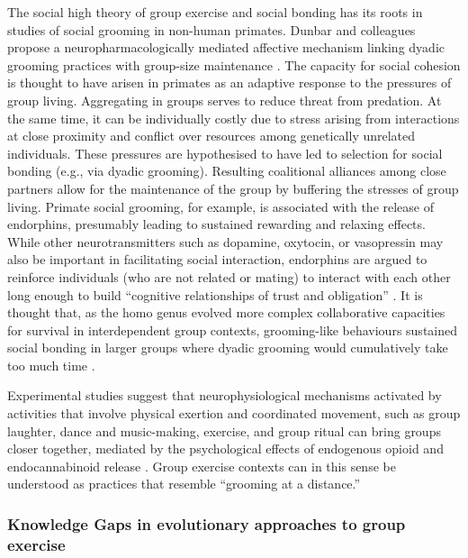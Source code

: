 The social high theory of group exercise and social bonding has its roots in studies of social grooming in non-human primates. Dunbar and colleagues propose a neuropharmacologically mediated affective mechanism linking dyadic grooming practices with group-size maintenance \citep{Machin2011}.  The capacity for social cohesion is thought to have arisen in primates as an adaptive response to the pressures of group living.  Aggregating in groups serves to reduce threat from predation.  At the same time, it can be individually costly due to stress arising from interactions at close proximity and conflict over resources among genetically unrelated individuals.  These pressures are hypothesised to have led to selection for social bonding (e.g., via dyadic grooming).  Resulting coalitional alliances among close partners allow for the maintenance of the group by buffering the stresses of group living.  Primate social grooming, for example, is associated with the release of endorphins, presumably leading to sustained rewarding and relaxing effects.  While other neurotransmitters such as dopamine, oxytocin, or vasopressin may also be important in facilitating social interaction, endorphins are argued to reinforce individuals (who are not related or mating) to interact with each other long enough to build ``cognitive relationships of trust and obligation'' \citep[1839]{Dunbar2012}.  It is thought that, as the homo genus evolved more complex collaborative capacities for survival in interdependent group contexts, grooming-like behaviours sustained social bonding in larger groups where dyadic grooming would cumulatively take too much time \citep{Dunbar2012}.

Experimental studies suggest that neurophysiological mechanisms activated by activities that involve physical exertion and coordinated movement, such as group laughter, dance and music-making, exercise, and group ritual can bring groups closer together, mediated by the psychological effects of endogenous opioid and endocannabinoid release \citep{Cohen2009,Fischer2014a,Fischer2014,Sullivan2014,Tarr2016,Tarr2015}. Group exercise contexts can in this sense be understood as practices that resemble ``grooming at a distance.''



\subsubsection{Knowledge Gaps in evolutionary approaches to group exercise}

